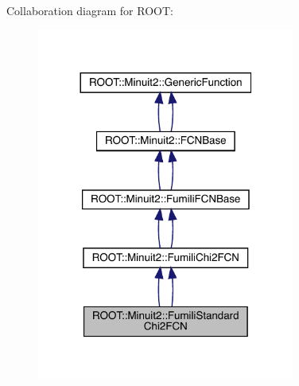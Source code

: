 Collaboration diagram for R\+O\+OT\+:\nopagebreak
\begin{figure}[H]
\begin{center}
\leavevmode
\includegraphics[width=240pt]{da/db2/classROOT_1_1Minuit2_1_1FumiliStandardChi2FCN__coll__graph}
\end{center}
\end{figure}
